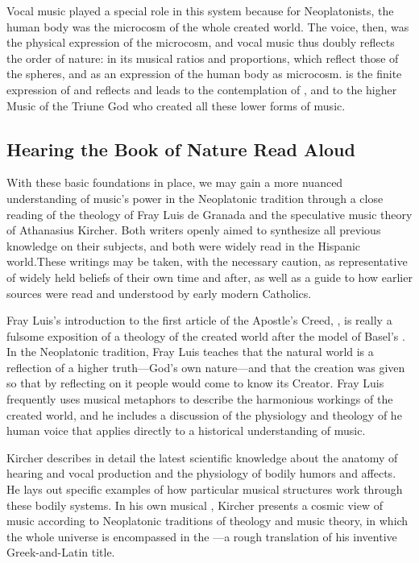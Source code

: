 Vocal music played a special role in this system because for Neoplatonists, the human body was the microcosm of the whole created world.
The voice, then, was the physical expression of the microcosm, and vocal music thus doubly reflects the order of nature: in its musical ratios and proportions, which reflect those of the spheres, and as an expression of the human body as microcosm.
 is the finite expression of  and reflects and leads to the contemplation of , and to the higher Music of the Triune God who created all these lower forms of music.

\subsection{Hearing the Book of Nature Read Aloud}

With these basic foundations in place, we may gain a more nuanced understanding of music's power in the Neoplatonic tradition through a close reading of the theology of Fray Luis de Granada and the speculative music theory of Athanasius Kircher.
Both writers openly aimed to synthesize all previous knowledge on their subjects, and both were widely read in the Hispanic world.\citXXX[holdings]
These writings may be taken, with the necessary caution, as representative of widely held beliefs of their own time and after, as well as a guide to how earlier sources were read and understood by early modern Catholics.

Fray Luis's introduction to the first article of the Apostle's Creed, , is really a fulsome exposition of a theology of the created world after the model of Basel's .\citXXX{}
In the Neoplatonic tradition, Fray Luis teaches that the natural world is a reflection of a higher truth---God's own nature---and that the creation was given so that by reflecting on it people would come to know its Creator.
Fray Luis frequently uses musical metaphors to describe the harmonious workings of the created world, and he includes a discussion of the physiology and theology of he human voice that applies directly to a historical understanding of music.

Kircher describes in detail the latest scientific knowledge about the anatomy of hearing and vocal production and the physiology of bodily humors and affects.
He lays out specific examples of how particular musical structures work through these bodily systems.\citXXX{}
In his own musical , Kircher presents a cosmic view of music according to Neoplatonic traditions of theology and music theory, in which the whole universe is encompassed in the ---a rough translation of his inventive Greek-and-Latin title.

